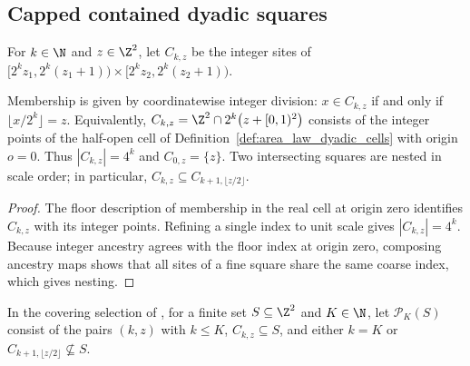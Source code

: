 \subsection{Capped contained dyadic squares}

\begin{definition}
    \label{def:area_law_lattice_dyadic_square}
    \leanok
    For $k\in\N$ and $z\in\Z^2$, let $C_{k,z}$ be the integer sites of
    $\lbrack 2^kz_1,2^k(z_1+1))\times\lbrack 2^kz_2,2^k(z_2+1))$.
\end{definition}

\begin{lemma}
    \label{thm:area_law_lattice_dyadic_nesting}
    \leanok
    Membership is given by coordinatewise integer division:
    $x\in C_{k,z}$ if and only if $\lfloor x/2^k\rfloor=z$.
    Equivalently, $C_{k,z}=\Z^2\cap 2^k\bigl(z+[0,1)^2\bigr)$ consists of
    the integer points of the half-open cell of
    Definition~\ref{def:area_law_dyadic_cells} with origin $o=0$.
    Thus $|C_{k,z}|=4^k$ and $C_{0,z}=\{z\}$.
    Two intersecting squares are nested in scale order; in particular,
    $C_{k,z}\subseteq C_{k+1,\lfloor z/2\rfloor}$.
\end{lemma}
\begin{proof}\leanok
    The floor description of membership in the real cell at origin zero
    identifies $C_{k,z}$ with its integer points. Refining a single index
    to unit scale gives $|C_{k,z}|=4^k$. Because integer ancestry agrees
    with the floor index at origin zero, composing ancestry maps shows that
    all sites of a fine square share the same coarse index, which gives nesting.
\end{proof}

\begin{definition}
    \label{def:area_law_capped_dyadic_partition}
    \leanok
    In the covering selection of \cite[Lemma~9.4]{OpenAI2026AreaLaw}, for a
    finite set $S\subseteq\Z^2$ and $K\in\N$, let $\mathcal P_K(S)$
    consist of the pairs $(k,z)$ with $k\le K$, $C_{k,z}\subseteq S$, and
    either $k=K$ or $C_{k+1,\lfloor z/2\rfloor}\not\subseteq S$.
\end{definition}

